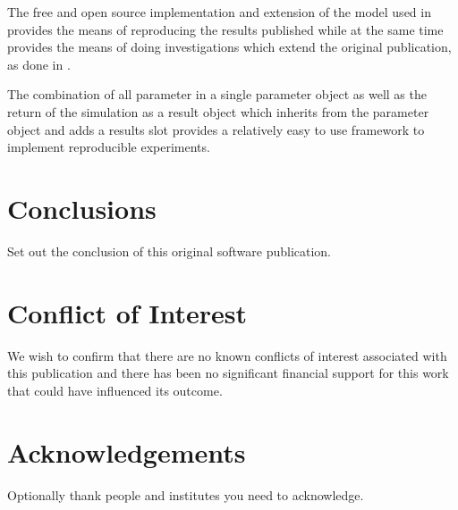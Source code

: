\documentclass[]{elsarticle} %
\begin{document}
The free and open source implementation and extension of the model used
in \citet{Bush2017} provides the means of reproducing the results
published while at the same time provides the means of doing
investigations which extend the original publication, as done in
\citet{REF_NEEDED}.

The combination of all parameter in a single parameter object as well as
the return of the simulation as a result object which inherits from the
parameter object and adds a results slot provides a relatively easy to
use framework to implement reproducible experiments.

\hypertarget{conclusions}{%
\section{Conclusions}\label{conclusions}}

Set out the conclusion of this original software publication.

\hypertarget{conflict-of-interest}{%
\section{Conflict of Interest}\label{conflict-of-interest}}

We wish to confirm that there are no known conflicts of interest
associated with this publication and there has been no significant
financial support for this work that could have influenced its outcome.

\hypertarget{acknowledgements}{%
\section{Acknowledgements}\label{acknowledgements}}

Optionally thank people and institutes you need to acknowledge.

\renewcommand\refname{References}

\end{document}
